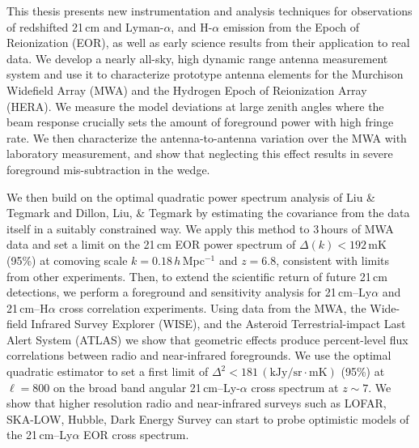 % 
% 
%

This thesis presents new instrumentation and analysis techniques for observations of redshifted 21\,cm and Lyman-$\alpha$, and H-$\alpha$  emission from the Epoch of Reionization (EOR), as well as early science results from their application to real data. We develop a nearly all-sky, high dynamic range antenna measurement system and use it to characterize prototype antenna elements for the Murchison Widefield Array (MWA) and the Hydrogen Epoch of Reionization Array (HERA). We measure the model deviations at large zenith angles where the beam response crucially sets the amount of foreground power with high fringe rate. We then characterize the antenna-to-antenna variation over the MWA with laboratory measurement, and show that neglecting this effect results in severe foreground mis-subtraction in the wedge.

We then build on the optimal quadratic power spectrum analysis of Liu \& Tegmark and Dillon, Liu, \& Tegmark by estimating the covariance from the data itself in a suitably constrained way. We apply this method to 3\,hours of MWA data and set a limit on the 21\,cm EOR power spectrum of $\Delta(k) < 192$\,mK (95\%) at comoving scale $k = 0.18$\,$h$\,Mpc$^{-1}$ and $z = 6.8$, consistent with limits from other experiments. Then, to extend the scientific return of future 21\,cm detections, we perform a foreground and sensitivity analysis for 21\,cm--Ly$\alpha$ and 21\,cm--H$\alpha$ cross correlation experiments. Using data from the MWA, the Wide-field Infrared Survey Explorer (WISE), and the Asteroid Terrestrial-impact Last Alert System (ATLAS) we show that geometric effects produce percent-level flux correlations between radio and near-infrared foregrounds. We use the optimal quadratic estimator to set a first limit of $\Delta^2<181\,(\text{kJy/sr}\cdot \text{mK})$ (95\%) at $\ell=800$ on the broad band angular 21\,cm--Ly-$\alpha$ cross spectrum at $z\sim7$. We show that higher resolution radio and near-infrared surveys such as LOFAR, SKA-LOW, Hubble, Dark Energy Survey can start to probe optimistic models of the 21\,cm--Ly$\alpha$ EOR cross spectrum.


